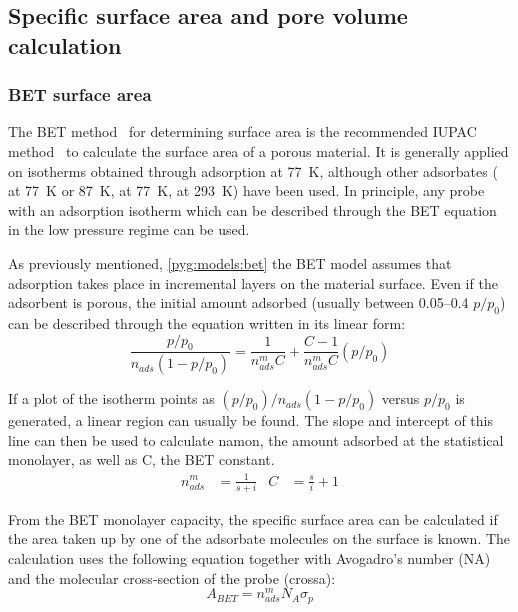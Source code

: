 
\subsection{Specific surface area and pore volume calculation}

\subsubsection{\gls{BET} surface area}\label{pyg:charac:betarea}

The \gls{BET} method~\cite{brunauerAdsorptionGasesMultimolecular1938}
for determining surface area is the recommended \gls{IUPAC}
method~\cite{thommesPhysisorptionGasesSpecial2015}
to calculate the surface area of a porous material.
It is generally applied on isotherms obtained through 
adsorption at \SI{77}{\kelvin}, although other adsorbates
( at \SI{77}{\kelvin} or \SI{87}{\kelvin},
 at \SI{77}{\kelvin},  at \SI{293}{\kelvin})
have been used. In principle, any probe with an adsorption isotherm
which can be described through the \gls{BET} equation in the low pressure regime
can be used.

As previously mentioned, \autoref{pyg:models:bet} the \gls{BET} model assumes
that adsorption takes place in incremental layers on the material
surface. Even if the adsorbent is porous, the initial amount adsorbed
(usually between 0.05--0.4 \(p/p_0\)) can be
described through the equation written in its linear form:
%
\begin{equation}
	\frac{p/p_0}{n_{ads} (1-p/p_0)} = \frac{1}{n_{ads}^m C} + \frac{C - 1}{n_{ads}^m C}(p/p_0)
\end{equation}

If a plot of the isotherm points as \({(p/p_0)}/{n_{ads}(1-p/p_0)}\)
versus \(p/p_0\) is generated, a linear region
can usually be found. The slope and intercept of this line
can then be used to calculate \gls{namon}, the amount adsorbed at the
statistical monolayer, as well as \gls{C}, the \gls{BET} constant.
%
\begin{align}
	n_{ads}^{m} & = \frac{1}{s+i} & C & = \frac{s}{i} + 1
\end{align}

From the \gls{BET} monolayer capacity, the specific surface area can be
calculated if the area taken up by one of the adsorbate molecules
on the surface is known. The calculation uses the following equation
together with Avogadro's number (\gls{NA}) and the molecular cross-section 
of the probe (\gls{crossa}):
%
\begin{equation}
	A_{BET} = n_{ads}^m N_A \sigma_p
\end{equation}


